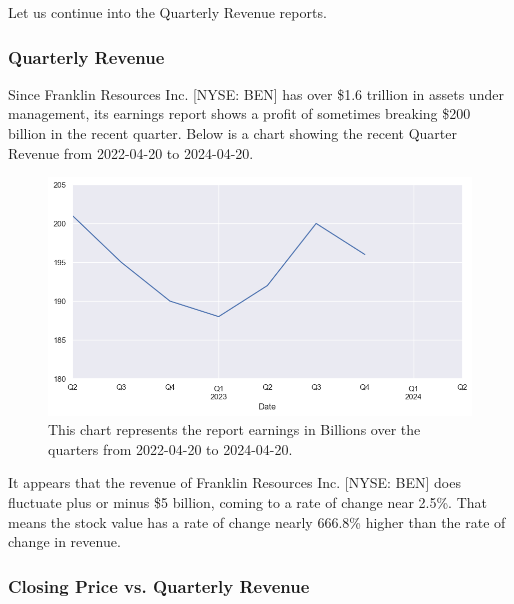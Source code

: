 \documentclass[9pt,a4paper,twoside]{tau}
\begin{document}
        Let us continue into the Quarterly Revenue reports.
            
    \subsubsection{Quarterly Revenue}
        
        Since Franklin Resources Inc. [NYSE: BEN] has over \$1.6 trillion in assets under management, its earnings report shows a profit of sometimes breaking \$200 billion in the recent quarter. Below is a chart showing the recent Quarter Revenue from 2022-04-20 to 2024-04-20.
            \begin{figure}[H]
                \centering
                \includegraphics[width=0.85\columnwidth]{images/EarningByQt.png}
                \caption{This chart represents the report earnings in Billions over the quarters from 2022-04-20 to 2024-04-20.}
                \label{fig:figure}
            \end{figure}
        
        It appears that the revenue of Franklin Resources Inc. [NYSE: BEN] does fluctuate plus or minus \$5 billion, coming to a rate of change near 2.5\%. That means the stock value has a rate of change nearly 666.8\% higher than the rate of change in revenue. 
            
    \subsubsection{Closing Price vs. Quarterly Revenue}   
        
\end{document}
